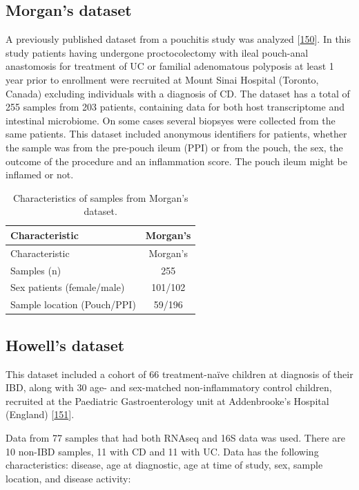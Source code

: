 \documentclass[
  12pt,
  a4paper,
  twoside,
  openright]{book}
\begin{document}
\hypertarget{methods-morgan}{%
\subsection{Morgan's dataset}\label{methods-morgan}}

A previously published dataset from a pouchitis study was analyzed {[}\protect\hyperlink{ref-morgan2015}{150}{]}.
In this study patients having undergone proctocolectomy with ileal pouch-anal anastomosis for treatment of UC or familial adenomatous polyposis at least 1 year prior to enrollment were recruited at Mount Sinai Hospital (Toronto, Canada) excluding individuals with a diagnosis of CD.
The dataset has a total of 255 samples from 203 patients, containing data for both host transcriptome and intestinal microbiome.
On some cases several biopsyes were collected from the same patients.
This dataset included anonymous identifiers for patients, whether the sample was from the pre-pouch ileum (PPI) or from the pouch, the sex, the outcome of the procedure and an inflammation score.
The pouch ileum might be inflamed or not.

\begin{longtable}[]{@{}lc@{}}
\caption{\label{tab:Morgan} Characteristics of samples from Morgan's dataset.}\tabularnewline
\toprule
Characteristic & Morgan's \\
\midrule
\endfirsthead
\toprule
Characteristic & Morgan's \\
\midrule
\endhead
Samples (n) & 255 \\
Sex patients (female/male) & 101/102 \\
Sample location (Pouch/PPI) & 59/196 \\
\bottomrule
\end{longtable}

\hypertarget{methods-howell}{%
\subsection{Howell's dataset}\label{methods-howell}}

This dataset included a cohort of 66 treatment-naïve children at diagnosis of their IBD, along with 30 age- and sex-matched non-inflammatory control children, recruited at the Paediatric Gastroenterology unit at Addenbrooke's Hospital (England) {[}\protect\hyperlink{ref-howell2018}{151}{]}.

Data from 77 samples that had both RNAseq and 16S data was used.
There are 10 non-IBD samples, 11 with CD and 11 with UC.
Data has the following characteristics: disease, age at diagnostic, age at time of study, sex, sample location, and disease activity:
\end{document}
